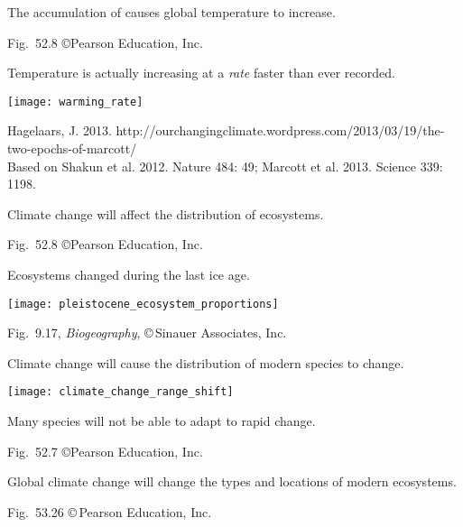 \documentclass[t,handout]{beamer}  %
\begin{document}
%
{
\begin{frame}[b]{The accumulation of  causes global temperature to increase.}

	\hfill \tiny Fig.~52.8 \copyright Pearson Education, Inc.
\end{frame}
}
%

\begin{frame}[t]{Temperature is actually increasing at a \emph{rate} faster than ever recorded.}
	
	\vspace*{-0.5\baselineskip}
	
	{\centering\texttt{[image: warming\_rate]}\par%
	}
	
	\vfilll
	
	\tiny Hagelaars, J. 2013. http://ourchangingclimate.wordpress.com/2013/03/19/the-two-epochs-of-marcott/\\
Based on Shakun et al. 2012. Nature 484: 49; Marcott et al. 2013. Science 339: 1198. 

\end{frame}
%
{
	\begin{frame}[b]{Climate change will affect the distribution of ecosystems.}
		
		\hfill \tiny Fig.~52.8 \copyright Pearson Education, Inc.
	\end{frame}
}
%
\begin{frame}{Ecosystems changed during the last ice age.}

	\texttt{[image: pleistocene\_ecosystem\_proportions]}

	\vfilll
	
	\hfill \tiny Fig.~9.17, \emph{Biogeography}, \copyright\,Sinauer Associates, Inc.
\end{frame}
%
\begin{frame}[t]{Climate change will cause the distribution of modern species to change.}

	\texttt{[image: climate\_change\_range\_shift]}\par
	
	\hangpara Many species will not be able to adapt to rapid change.
	
	\vfilll
	
	\hfill \tiny Fig.~52.7 \copyright Pearson Education, Inc.

\end{frame}
%
{
\begin{frame}[b]{Global climate change will change the types and locations of modern ecosystems.}

	\hfill \tiny Fig.~53.26 \copyright\,Pearson Education, Inc.
\end{frame}
}
%

\end{document}
